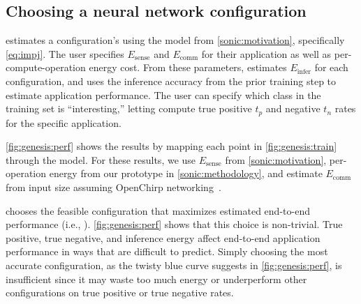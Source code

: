 \tabSONICleGenesisNNS

\subsection{Choosing a neural network configuration}

\genesis estimates a configuration's \metric using the model
from \autoref{sonic:motivation}, specifically \autoref{eq:impj}.
%
The user specifies $E_\text{sense}$ and $E_\text{comm}$ for their
application as well as per-compute-operation energy cost.
%
From these parameters, \genesis estimates $E_\text{infer}$ for each
configuration, and uses the inference accuracy from the prior training step to
estimate application performance.
%
The user can specify which class in the training set is
``interesting,'' letting \genesis compute true positive $t_p$ and negative $t_n$ rates for the
specific application.

\autoref{fig:genesis:perf} shows the results by mapping each point in
\autoref{fig:genesis:train} through the model.
%
For these results, we use $E_\text{sense}$ from
\autoref{sonic:motivation}, per-operation energy from our \sonictails
prototype in \autoref{sonic:methodology}, and estimate $E_\text{comm}$
from input size assuming OpenChirp networking~\cite{dongare2017openchirp}.

\genesis chooses the feasible configuration that maximizes
estimated end-to-end performance (i.e., \metric).
%
\autoref{fig:genesis:perf} shows that this choice is non-trivial.
%
True positive, true negative, and inference energy affect end-to-end application
performance in ways that are difficult to predict. Simply choosing the most accurate
configuration, as the twisty blue curve suggests in \autoref{fig:genesis:perf}, 
is insufficient since it may waste too much energy or underperform other 
configurations on true positive or true negative rates.
